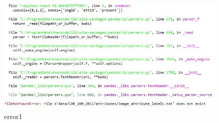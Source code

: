 \begin{enumerate}
\begin{enumerate}
\begin{itemize}
\begin{itemize}
\begin{enumerate}
\par
\end{enumerate}
\end{itemize}
\par
\par
\begin{figure}[ht]
\centering
\includegraphics[scale=0.4]{figures/error1.jpg}
\caption{error1}
\label{contoh}
\end{figure}
\par
\par
\par

\end{itemize}
\end{enumerate}
\end{enumerate}
